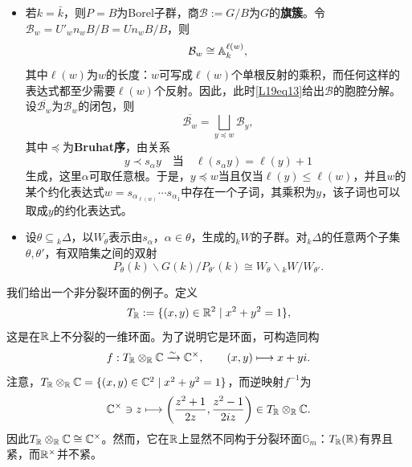 \begin{itemize}
\item 若$k=\bar k$，则$P=B$为Borel子群，商$\mathcal B:=G/B$为$G$的\textbf{旗簇}。令$\mathcal B_w=U'_wn_wB/B=Un_wB/B$，则
\[\mathcal B_w\cong\mathbb{A}_k^{\ell(w)},\]
其中$\ell(w)$为$w$的长度：$w$可写成$\ell(w)$个单根反射的乘积，而任何这样的表达式都至少需要$\ell(w)$个反射。因此，此时\eqref{L19eq13}给出$\mathcal B$的胞腔分解。设$\overline{\mathcal B_w}$为$\mathcal B_w$的闭包，则
\[\overline{\mathcal B_w}=\bigsqcup_{y\preceq w}\mathcal B_y,\]
其中$\preceq$为\textbf{Bruhat序}，由关系
\[y\prec s_\alpha y\quad\text{当}\quad\ell(s_\alpha y)=\ell(y)+1\]
生成，这里$\alpha$可取任意根。于是，$y\preceq w$当且仅当$\ell(y)\le\ell(w)$，并且$w$的某个约化表达式$w=s_{\alpha_{\ell(w)}}\cdots s_{\alpha_1}$中存在一个子词，其乘积为$y$，该子词也可以取成$y$的约化表达式。
\item 设$\theta\subseteq{}_k\Delta$，以$W_\theta$表示由$s_\alpha$，$\alpha\in\theta$，生成的${}_kW$的子群。对${}_k\Delta$的任意两个子集$\theta,\theta'$，有双陪集之间的双射
\[P_\theta(k)\backslash G(k)/P_{\theta'}(k)\cong W_\theta\backslash{}_kW/W_{\theta'}.\]
\end{itemize}
\begin{example}\label{L19S1O1}
我们给出一个非分裂环面的例子。定义
\[T_{\mathbb{R}}:=\{(x,y)\in\mathbb{R}^2\mid x^2+y^2=1\},\]
这是在$\mathbb{R}$上不分裂的一维环面。为了说明它是环面，可构造同构
\[f:T_{\mathbb{R}}\otimes_{\mathbb{R}}\mathbb{C}\xrightarrow{\sim}\mathbb{C}^\times,\qquad(x,y)\longmapsto x+yi.\]
注意，$T_{\mathbb{R}}\otimes_{\mathbb{R}}\mathbb{C}=\{(x,y)\in\mathbb{C}^2\mid x^2+y^2=1\}$，而逆映射$f^{-1}$为
\[\mathbb{C}^\times\ni z\longmapsto\left(\frac{z^2+1}{2z},\frac{z^2-1}{2iz}\right)\in T_{\mathbb{R}}\otimes_{\mathbb{R}}\mathbb{C}.\]
因此$T_{\mathbb{R}}\otimes_{\mathbb{R}}\mathbb{C}\cong\mathbb{C}^\times$。然而，它在$\mathbb{R}$上显然不同构于分裂环面$\mathbb G_m$：$T_{\mathbb{R}}(\mathbb{R})$有界且紧，而$\mathbb{R}^\times$并不紧。
\end{example}
